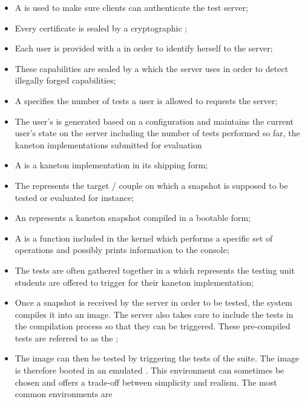 \begin{itemize}
  \item
    A  is used to make sure clients can authenticate the
    test server;
  \item
    Every certificate is sealed by a cryptographic ;
  \item
    Each user is provided with a  in order to identify
    herself to the server;
  \item
    These capabilities are sealed by a  which the server uses
    in order to detect illegally forged capabilities;
  \item
    A  specifies the number of tests a user is allowed
    to requests the server;
  \item
    The user's  is generated based on a configuration and
    maintains the current user's state on the server including the number
    of tests performed so far, the kaneton implementations submitted for
    evaluation \etc{}
  \item
    A  is a kaneton implementation in its shipping form;
  \item
    The  represents the target
    / couple on which a snapshot is
    supposed to be tested or evaluated for instance;
  \item
    An  represents a kaneton snapshot compiled in a bootable
    form;
  \item
    A  is a function included in the kernel which performs a
    specific set of operations and possibly prints information to the console;
  \item
    The tests are often gathered together in a  which represents
    the testing unit students are offered to trigger for their kaneton
    implementation;
  \item
    Once a snapshot is received by the server in order to be tested,
    the system compiles it into an image. The server also takes care to
    include the tests in the compilation process so that they can be triggered.
    These pre-compiled tests are referred to as the ;
  \item
    The image can then be tested by triggering the tests of the suite. The
    image is therefore booted in an emulated . This
    environment can sometimes be chosen and offers a trade-off between
    simplicity and realism. The most common environments are 

\end{itemize}
